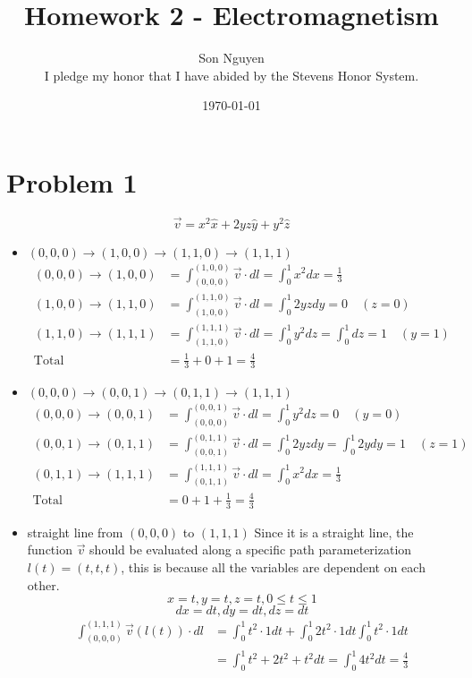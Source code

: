 \documentclass[12pt]{article}
\title{Homework 2 - Electromagnetism}
\author{Son Nguyen \\
I pledge my honor that I have abided by the Stevens Honor System.}
\date{\today}
\begin{document}
\maketitle
\section*{Problem 1}
\[\vec{v} = x^2 \hat{x} + 2yz \hat{y} +y^2 \hat{z}\]
\begin{itemize}
	\item \((0,0,0) \rightarrow (1,0,0) \rightarrow (1,1,0) \rightarrow (1,1,1)\)
	      \begin{align*}
		      (0,0,0) \rightarrow (1,0,0) & = \int_{(0,0,0)}^{(1,0,0)} \vec{v} \cdot dl = \int_{0}^{1} x^2 dx = \frac{1}{3}                   \\
		      (1,0,0) \rightarrow (1,1,0) & = \int_{(1,0,0)}^{(1,1,0)} \vec{v} \cdot dl = \int_{0}^{1} 2yz dy = 0 \quad (z = 0)               \\
		      (1,1,0) \rightarrow (1,1,1) & = \int_{(1,1,0)}^{(1,1,1)} \vec{v} \cdot dl = \int_{0}^{1} y^2 dz = \int_{0}^{1}dz = 1 \quad(y=1) \\
		      \text{Total}                & = \frac{1}{3} + 0 + 1 = \frac{4}{3}
	      \end{align*}
	\item \((0,0,0) \rightarrow (0,0,1) \rightarrow (0,1,1) \rightarrow (1,1,1)\)
	      \begin{align*}
		      (0,0,0) \rightarrow (0,0,1) & = \int_{(0,0,0)}^{(0,0,1)} \vec{v} \cdot dl = \int_{0}^{1} y^2 dz = 0 \quad (y = 0)                     \\
		      (0,0,1) \rightarrow (0,1,1) & = \int_{(0,0,1)}^{(0,1,1)} \vec{v} \cdot dl = \int_{0}^{1} 2yz dy = \int_{0}^{1} 2ydy = 1 \quad (z = 1) \\
		      (0,1,1) \rightarrow (1,1,1) & = \int_{(0,1,1)}^{(1,1,1)} \vec{v} \cdot dl = \int_{0}^{1} x^2 dx = \frac{1}{3}                         \\
		      \text{Total}                & = 0 + 1 + \frac{1}{3} = \frac{4}{3}
	      \end{align*}
	\item straight line from \((0,0,0)\) to \((1,1,1)\)
	      Since it is a straight line, the function \(\vec{v}\) should be evaluated along a specific path parameterization \(l(t) = (t,t,t) \), this is because
	      all the variables are dependent on each other.
	      \[x = t, y = t, z = t, 0 \leq t \leq 1\]
	      \[dx = dt, dy = dt, dz = dt\]
	      \begin{align*}
		      \int_{(0,0,0)}^{(1,1,1)} \vec{v}(l(t)) \cdot dl & = \int_{0}^{1} t^2 \cdot 1 dt + \int_{0}^{1} 2t^2 \cdot 1 dt \int_{0}^{1} t^2 \cdot 1 dt \\
		                                                      & = \int_{0}^{1} t^2 + 2t^2 + t^2 dt = \int_{0}^{1} 4t^2 dt = \frac{4}{3}
	      \end{align*}
\end{itemize}
\end{document}
